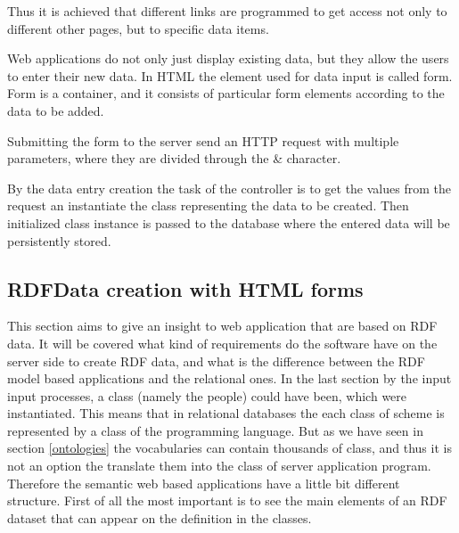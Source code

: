 
Thus it is achieved that different links are programmed to get access not only to different other pages, but to specific data items.
  

Web applications do not only just display existing data, but they allow the users to enter their new data. In HTML the element used for data input is called form. Form is a container, and it consists of particular form elements according to the data to be added. 


Submitting the form to the server send an HTTP request with multiple parameters, where they are divided through the \& character.


By the data entry creation the task of the controller is to get the values from the request an instantiate the class representing the data to be created. Then initialized class instance is passed to the database where the entered data will be persistently stored.



\subsection{RDFData creation with HTML forms} \label{rdfWebapp}

This section aims to give an insight to web application that are based on RDF data. It will be covered what kind of requirements do the software have on the server side to create RDF data, and what is the difference between the RDF model based applications and the relational ones. In the last section by the input input processes, a class (namely the people) could have been, which were instantiated. This means that in relational databases the each class of scheme is represented by a class of the programming language. But as we have seen in section \ref{ontologies} the vocabularies can contain thousands of class, and thus it is not an option the translate them into the class of server application program. 
Therefore the semantic web based applications have a little bit different structure. First of all the most important is to see the main elements of an RDF dataset that can appear on the definition in the classes.









